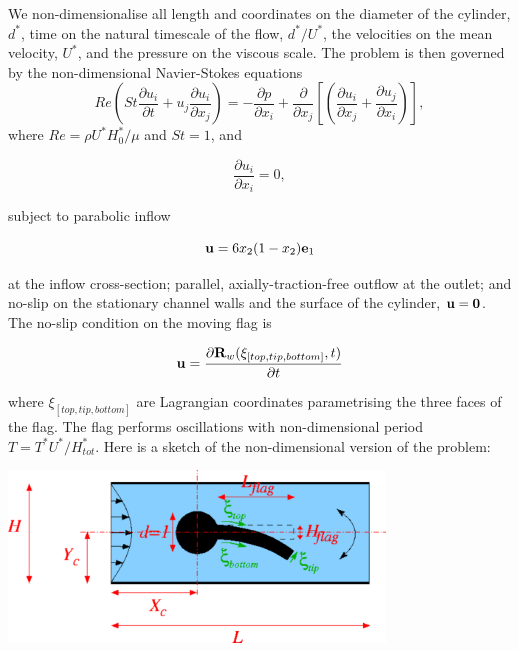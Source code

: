 We non-\/dimensionalise all length and coordinates on the diameter of the cylinder, $ d^* $, time on the natural timescale of the flow, $ d^*/U^* $, the velocities on the mean velocity, $ U^* $, and the pressure on the viscous scale. The problem is then governed by the non-\/dimensional Navier-\/\+Stokes equations \[ Re \left( St \frac{\partial u_i}{\partial t} + u_j \frac{\partial u_i}{\partial x_j} \right) = - \frac{\partial p}{\partial x_i} + \frac{\partial }{\partial x_j} \left[ \left( \frac{\partial u_i}{\partial x_j} + \frac{\partial u_j}{\partial x_i} \right) \right], \] where $ Re = \rho U^* H_0^* / \mu $ and $ St = 1 $, and \begin{center} \[ \frac{\partial u_i}{\partial x_i} = 0, \] \end{center}  subject to parabolic inflow \begin{center} \[ {\bf u} = 6 x_2 (1-x_2) {\bf e}_1 \] \end{center}  at the inflow cross-\/section; parallel, axially-\/traction-\/free outflow at the outlet; and no-\/slip on the stationary channel walls and the surface of the cylinder, $ {\bf u} = {\bf 0} $. The no-\/slip condition on the moving flag is \begin{center} \[ {\bf u} = \frac{\partial {\bf R}_w(\xi_{[top,tip,bottom]},t)}{\partial t} \] \end{center}  where $ \xi_{[top,tip,bottom]} $ are Lagrangian coordinates parametrising the three faces of the flag. The flag performs oscillations with non-\/dimensional period $ T = T^* U^* / H^*_{tot} $. Here is a sketch of the non-\/dimensional version of the problem\+:

 
\begin{DoxyImage}
\includegraphics[width=0.75\textwidth]{turek_flag_non_fsi}
\end{DoxyImage}




